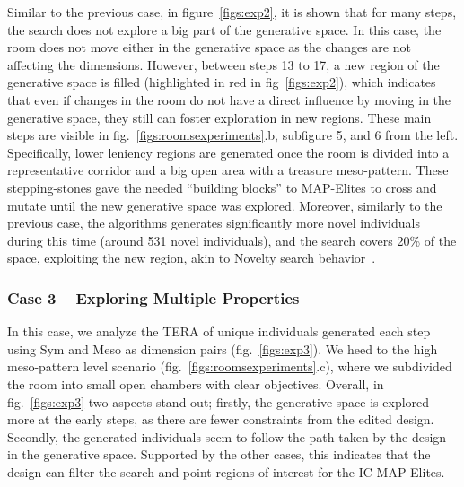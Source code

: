 Similar to the previous case, in figure~\ref{figs:exp2}, it is shown that for many steps, the search does not explore a big part of the generative space. In this case, the room does not move either in the generative space as the changes are not affecting the dimensions. However, between steps 13 to 17, a new region of the generative space is filled (highlighted in red in fig~\ref{figs:exp2}), which indicates that even if changes in the room do not have a direct influence by moving in the generative space, they still can foster exploration in new regions. These main steps are visible in fig.~\ref{figs:roomsexperiments}.b, subfigure 5, and 6 from the left. Specifically, lower leniency regions are generated once the room is divided into a representative corridor and a big open area with a treasure meso-pattern. These stepping-stones gave the needed “building blocks” to MAP-Elites to cross and mutate until the new generative space was explored. Moreover, similarly to the previous case, the algorithms generates significantly more novel individuals during this time  (around 531 novel individuals), and the search covers 20\% of the space, exploiting the new region, akin to Novelty search behavior~.



\subsubsection{Case 3 – Exploring Multiple Properties}
\label{sec:case3}


In this case, we analyze the TERA of unique individuals generated each step using Sym and Meso as dimension pairs (fig.~\ref{figs:exp3}). We heed to the high meso-pattern level scenario (fig.~\ref{figs:roomsexperiments}.c), where we subdivided the room into small open chambers with clear objectives. Overall, in fig.~\ref{figs:exp3} two aspects stand out; firstly, the generative space is explored more at the early steps, as there are fewer constraints from the edited design. Secondly, the generated individuals seem to follow the path taken by the design in the generative space. Supported by the other cases, this indicates that the design can filter the search and point regions of interest for the IC MAP-Elites. %

